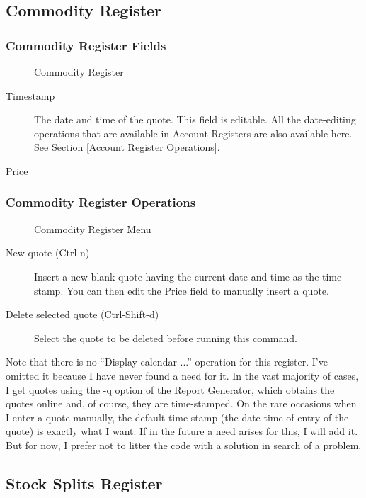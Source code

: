 \documentclass{report}
\newcommand{\graphicsfig}[5]{
\begin{figure}[#5]
\begin{center}
\resizebox{#1}{!}{\texttt{[image: \#2]}}
\end{center}
\caption{#3}
\label{#4}
\end{figure}
}
\begin{document}
\subsection{Commodity Register}
\subsubsection{Commodity Register Fields}
\graphicsfig{5in}{figures/commodity_register.png}{Commodity Register}{Commodity Register}{}
\begin{description}
\item[Timestamp] The date and time of the quote. This field is editable. All the date-editing operations that are available in Account Registers are also available here. See Section \ref{Account Register Operations}.
\item[Price] 
\end{description}

\subsubsection{Commodity Register Operations}
\label{Commodity Register Operations}
\graphicsfig{5in}{figures/commodity_register_menu.png}{Commodity Register Menu}{Commodity Register Menu}{}
\begin{description}
\item[New quote (Ctrl-n)] Insert a new blank quote having the current date and time as the time-stamp. You can then edit the Price field to manually insert a quote.
\item[Delete selected quote (Ctrl-Shift-d)] Select the quote to be deleted before running this command.
\end{description}
Note that there is no ``Display calendar ...'' operation for this register. I've omitted it because I have never found a need for it. In the vast majority of cases, I get quotes using the -q option of the Report Generator, which obtains the quotes online and, of course, they are time-stamped. On the rare occasions when I enter a quote manually, the default time-stamp (the date-time of entry of the quote) is exactly what I want. If in the future a need arises for this, I will add it. But for now, I prefer not to litter the code with a solution in search of a problem.

\subsection{Stock Splits Register}
\end{document}
